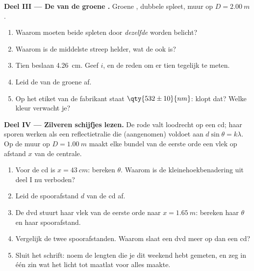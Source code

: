 \begin{problem}
\medskip
\noindent\textbf{Deel III --- De  van de groene .} Groene
, dubbele spleet, muur op $D = \qty{2.00}{m}$.
\begin{enumerate}[resume]
  \item Waarom moeten beide spleten door \emph{dezelfde}  worden
        belicht?
  \item Waarom is de middelste streep helder, wat de  ook is?
  \item Tien  beslaan \qty{4.26}{cm}. Geef $i$, en de
        reden om er tien tegelijk te meten.
  \item Leid de  van de groene  af.
  \item Op het etiket van de fabrikant staat $\qty{532 \pm 10}{nm}$:
        klopt dat? Welke kleur verwacht je?
\end{enumerate}

\medskip
\noindent\textbf{Deel IV --- Zilveren schijfjes lezen.} De rode 
valt loodrecht op een cd; haar sporen werken als een reflectietralie die
(aangenomen) voldoet aan $d \sin\theta = k\lambda$. Op de muur op
$D = \qty{1.00}{m}$ maakt elke bundel van de eerste orde een vlek op
afstand $x$ van de centrale.
\begin{enumerate}[resume]
  \item Voor de cd is $x = \qty{43}{cm}$: bereken $\theta$. Waarom is de
        kleinehoekbenadering uit deel I nu verboden?
  \item Leid de spoorafstand $d$ van de cd af.
  \item De dvd stuurt haar vlek van de eerste orde naar
        $x = \qty{1.65}{m}$: bereken haar $\theta$ en haar spoorafstand.
  \item Vergelijk de twee spoorafstanden. Waarom slaat een dvd meer op dan
        een cd?
  \item Sluit het schrift: noem de lengten die je dit weekend hebt
        gemeten, en zeg in één zin wat het licht tot maatlat voor alles
        maakte.
\end{enumerate}
\end{problem}
